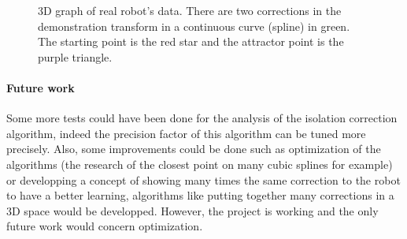 \begin{figure}[H]
\centering
{}
\caption{3D graph of real robot's data. There are two corrections in the demonstration transform in a continuous curve (spline) in green. The starting point is the red star and the attractor point is the purple triangle.}
\label{Robotsdata}
\end{figure}

\paragraph*{Future work}

Some more tests could have been done for the analysis of the isolation correction algorithm, indeed the precision factor of this algorithm can be tuned more precisely. Also, some improvements could be done such as optimization of the algorithms (the research of the closest point on many cubic splines for example) or developping a concept of showing many times the same correction to the robot to have a better learning, algorithms like putting together many corrections in a 3D space would be developped. However, the project is working and the only future work would concern optimization.\\
